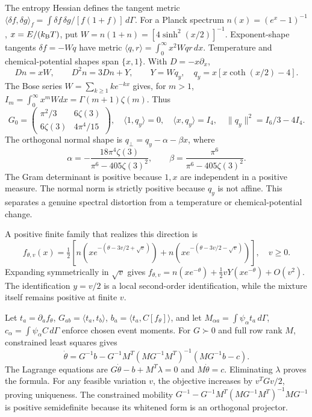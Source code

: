 The entropy Hessian defines the tangent metric
$\langle\delta f,\delta g\rangle_f=\int\delta f\,\delta g/[f(1+f)]\,d\Gamma$.
For a Planck spectrum $n(x)=(e^x-1)^{-1}$, $x=E/(k_{\rm B}T)$, put
$W=n(1+n)=[4\sinh^2(x/2)]^{-1}$. Exponent-shape tangents $\delta f=-Wq$ have metric
$\langle q,r\rangle=\int_0^\infty x^2Wqr\,dx$.
Temperature and chemical-potential shapes span $\{x,1\}$. With $D=-x\partial_x$,
\begin{equation}
 Dn=xW,\qquad D^2n=3Dn+Y,\qquad
 Y=Wq_y,\quad q_y=x[x\coth(x/2)-4].
 \label{v:bose_y}
\end{equation}
The Bose series $W=\sum_{k\ge1}ke^{-kx}$ gives, for $m>1$,
$I_m=\int_0^\infty x^mWdx=\Gamma(m+1)\zeta(m)$. Thus
\begin{equation}
 G_0=\begin{pmatrix}\pi^2/3&6\zeta(3)\\6\zeta(3)&4\pi^4/15\end{pmatrix},
 \quad \langle1,q_y\rangle=0,\quad \langle x,q_y\rangle=I_4,
 \quad \|q_y\|^2=I_6/3-4I_4.
 \label{v:bose_gram}
\end{equation}
The orthogonal normal shape is $q_\perp=q_y-\alpha-\beta x$, where
\begin{equation}
 \alpha=-\frac{18\pi^4\zeta(3)}{\pi^6-405\zeta(3)^2},\qquad
 \beta=\frac{\pi^6}{\pi^6-405\zeta(3)^2}.
 \label{v:bose_normal}
\end{equation}
The Gram determinant is positive because $1,x$ are independent in a positive measure. The normal norm is strictly positive because $q_y$ is not affine. This separates a genuine spectral distortion from a temperature or chemical-potential change.

A positive finite family that realizes this direction is
\begin{equation}
 f_{\theta,v}(x)=\tfrac12\left[
 n\!\left(xe^{-(\theta-3v/2+\sqrt v)}\right)+
 n\!\left(xe^{-(\theta-3v/2-\sqrt v)}\right)\right],\quad v\ge0.
 \label{v:positive_mixture}
\end{equation}
Expanding symmetrically in $\sqrt v$ gives
$f_{\theta,v}=n(xe^{-\theta})+\tfrac12vY(xe^{-\theta})+O(v^2)$.
The identification $y=v/2$ is a local second-order identification, while the mixture itself remains positive at finite $v$.

Let $t_a=\partial_af_\theta$, $G_{ab}=\langle t_a,t_b\rangle$,
$b_a=\langle t_a,C[f_\theta]\rangle$, and let $M_{\alpha a}=\int\psi_\alpha t_a\,d\Gamma$,
$c_\alpha=\int\psi_\alpha C\,d\Gamma$ enforce chosen event moments.
For $G\succ0$ and full row rank $M$, constrained least squares gives
\begin{equation}
 \dot\theta=G^{-1}b-G^{-1}M^T(MG^{-1}M^T)^{-1}(MG^{-1}b-c).
 \label{v:constrained_projection}
\end{equation}
The Lagrange equations are $G\dot\theta-b+M^T\lambda=0$ and $M\dot\theta=c$.
Eliminating $\lambda$ proves the formula. For any feasible variation $v$, the objective increases by $v^TGv/2$, proving uniqueness. The constrained mobility
$G^{-1}-G^{-1}M^T(MG^{-1}M^T)^{-1}MG^{-1}$ is positive semidefinite because its whitened form is an orthogonal projector.

